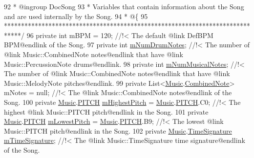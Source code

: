 \begin{DoxyCodeInclude}
92 \textcolor{comment}{     * @ingroup DocSong}
93 \textcolor{comment}{     * Variables that contain information about the Song and are used internally by the Song.}
94 \textcolor{comment}{     * @\{}
95 \textcolor{comment}{    *****************************************************************************/}
96     \textcolor{keyword}{private} \textcolor{keywordtype}{int} mBPM = 120; \textcolor{comment}{//!< The default @link DefBPM BPM@endlink of the Song.}
97 \textcolor{comment}{}    \textcolor{keyword}{private} \textcolor{keywordtype}{int} \hyperlink{group___song_priv_var_ga3dbce17d96b434d4492280c39cff1778}{mNumDrumNotes}; \textcolor{comment}{//!< The number of @link Music::CombinedNote notes@endlink that
       have @link Music::PercussionNote drums@endlink.}
98 \textcolor{comment}{}    \textcolor{keyword}{private} \textcolor{keywordtype}{int} \hyperlink{group___song_priv_var_gaf55b4fd2df0457ba1306a75ac3fdc8b1}{mNumMusicalNotes}; \textcolor{comment}{//!< The number of @link Music::CombinedNote
       notes@endlink that have @link Music::MelodyNote pitches@endlink.}
99 \textcolor{comment}{}    \textcolor{keyword}{private} List<\hyperlink{class_music}{Music}.\hyperlink{group___music_structs_struct_music_1_1_combined_note}{CombinedNote}> mNotes = null; \textcolor{comment}{//!< The @link Music::CombinedNote
       notes@endlink of the Song.}
100 \textcolor{comment}{}    \textcolor{keyword}{private} \hyperlink{class_music}{Music}.\hyperlink{group___music_enums_ga508f69b199ea518f935486c990edac1d}{PITCH} \hyperlink{group___song_priv_var_ga2dcd39d9add609e9df56a94057441dcc}{mHighestPitch} = \hyperlink{class_music}{Music}.\hyperlink{group___music_enums_ga508f69b199ea518f935486c990edac1d}{PITCH}.C0; \textcolor{comment}{//!< The highest
       @link Music::PITCH pitch@endlink in the Song.}
101 \textcolor{comment}{}    \textcolor{keyword}{private} \hyperlink{class_music}{Music}.\hyperlink{group___music_enums_ga508f69b199ea518f935486c990edac1d}{PITCH} \hyperlink{group___song_priv_var_ga293976ef4c2050687a81edfbf77b4fc1}{mLowestPitch} = \hyperlink{class_music}{Music}.\hyperlink{group___music_enums_ga508f69b199ea518f935486c990edac1d}{PITCH}.B9; \textcolor{comment}{//!< The lowest
       @link Music::PITCH pitch@endlink in the Song.}
102 \textcolor{comment}{}    \textcolor{keyword}{private} \hyperlink{class_music}{Music}.\hyperlink{group___music_structs_struct_music_1_1_time_signature}{TimeSignature} \hyperlink{group___song_priv_var_ga2b2dcc0e83e49f7303b6a1371877b25e}{mTimeSignature}; \textcolor{comment}{//!< The @link
       Music::TimeSignature time signature@endlink of the Song.}

\end{DoxyCodeInclude}
